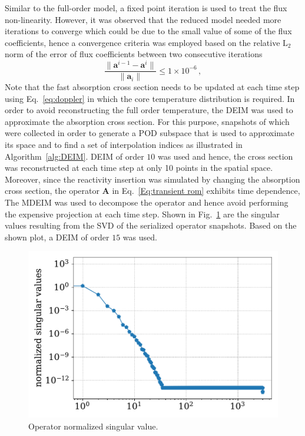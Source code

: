 \documentclass[]{interact}
\theoremstyle{plain}%
\theoremstyle{definition}
\theoremstyle{remark}
\begin{document}
Similar to the full-order model, a fixed point iteration is used to treat the flux non-linearity.
However, it was observed that the reduced model needed more iterations to converge which could be due to the small value of some of the flux coefficients, hence a convergence criteria was employed based on the relative $\text{L}_2$ norm of the error of flux coefficients between two consecutive iterations 
\begin{equation}
\frac{\| \mathbf{a}^{i-1} - \mathbf{a}^{i}\|}{\|\mathbf{a}_i \|} \le 1\times 10^{-6}  \, , 
\end{equation}
Note that the fast absorption cross section needs to be updated at each time step using Eq.~\ref{eq:doppler} in which the core temperature distribution is required.
In order to avoid reconstructing the full order temperature, 
the DEIM was used to approximate the absorption cross section.
For this purpose, snapshots of which were collected in order to generate a POD subspace that is used to approximate its space and to find a set of interpolation indices as illustrated in Algorithm~\ref{alg:DEIM}.
DEIM of order $10$ was used and hence, the cross section was reconstructed at each time step at only 10 points in the spatial space.
Moreover, since the reactivity insertion was simulated by changing the absorption cross section, the operator $\mathbf{A}$ in Eq.~\ref{Eq:transient rom} exhibits time dependence, 
The MDEIM was used to decompose the operator and hence avoid performing the expensive projection at each time step.
Shown in Fig.~\ref{fig:lra L singular values} are the singular values resulting from the SVD of the serialized operator snapshots. 
Based on the shown plot, a DEIM of order $15$ was used.
\begin{figure}[H]
	\includegraphics[width=1.0\linewidth]{../figures/LRA_L_singular_values.pdf}
	\caption{Operator normalized singular value.}
	\label{fig:lra L singular values}
\end{figure}
\end{document}

